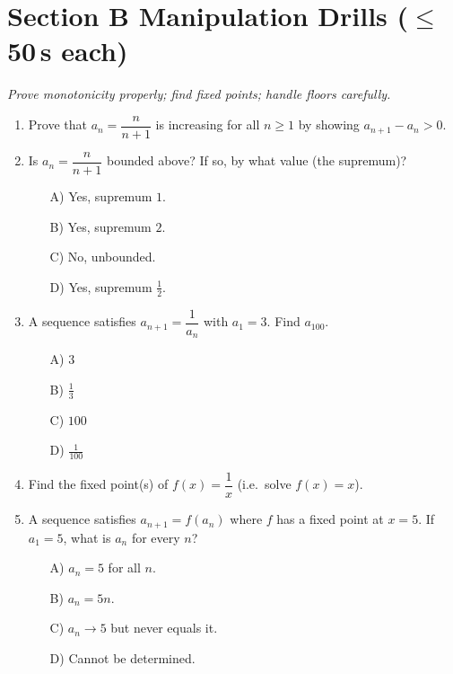 \documentclass[11pt,a4paper]{article}
\begin{document}
\section*{Section B \quad Manipulation Drills \hfill{\normalfont\small($\leq$50\,s each)}}

\noindent\textit{Prove monotonicity properly; find fixed points; handle floors carefully.}

\begin{enumerate}

\item Prove that $a_n=\dfrac n{n+1}$ is increasing for all $n\geq1$ by showing $a_{n+1}-a_n>0$.

\item Is $a_n=\dfrac n{n+1}$ bounded above? If so, by what value (the supremum)?
\begin{itemize}
\item[A)] Yes, supremum $1$.
\item[B)] Yes, supremum $2$.
\item[C)] No, unbounded.
\item[D)] Yes, supremum $\tfrac12$.
\end{itemize}

\item A sequence satisfies $a_{n+1}=\dfrac1{a_n}$ with $a_1=3$. Find $a_{100}$.
\begin{itemize}
\item[A)] $3$
\item[B)] $\tfrac13$
\item[C)] $100$
\item[D)] $\tfrac1{100}$
\end{itemize}

\item Find the fixed point(s) of $f(x)=\dfrac1x$ (i.e.\ solve $f(x)=x$).

\item A sequence satisfies $a_{n+1}=f(a_n)$ where $f$ has a fixed point at $x=5$. If $a_1=5$, what is $a_n$ for every $n$?
\begin{itemize}
\item[A)] $a_n=5$ for all $n$.
\item[B)] $a_n=5n$.
\item[C)] $a_n\to5$ but never equals it.
\item[D)] Cannot be determined.
\end{itemize}


\end{enumerate}
\end{document}

